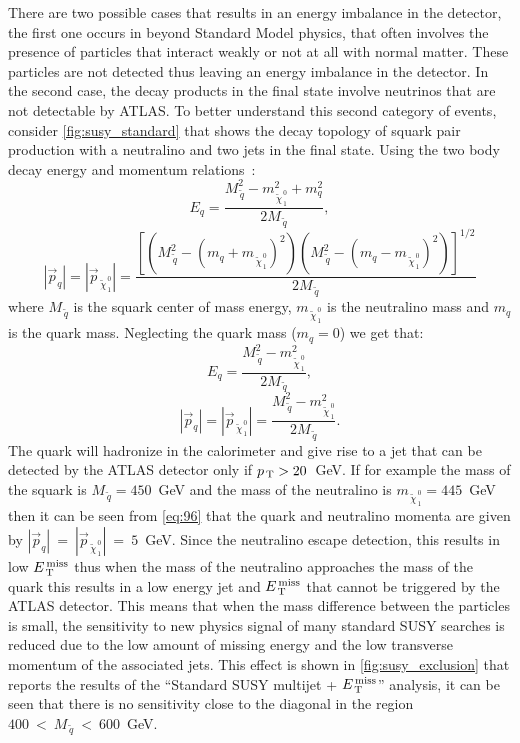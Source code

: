 There are two possible cases that results in an energy imbalance in the
detector, the first one occurs in beyond Standard Model physics, that often
involves the presence of particles that interact weakly or not at all with
normal matter. These particles are not detected thus leaving an energy imbalance
in the detector. In the second case, the decay products in the final state
involve neutrinos that are not detectable by ATLAS\@. To better understand this
second category of events, consider \cref{fig:susy_standard} that shows the
decay topology of squark pair production with a neutralino and two jets in the
final state. Using the two body decay energy and momentum relations~\cite{PDG}:
\begin{equation}
  \label{eq:93}
  E_q = \frac{M_{\, \tilde{q}}^2 - m_{\, \tilde{\chi}_{\, 1}^{\, 0}}^2 + m_q^2}{2
    M_{\, \tilde{q}}},
\end{equation}
\begin{equation}
  \label{eq:94}
  |\vec{p}_q| = |\vec{p}_{\, \tilde{\chi}_{\, 1}^{\, 0}}| = \frac{\left[ \left(
        M_{\, \tilde{q}}^2 - (m_q + m_{\, \tilde{\chi}_{\, 1}^{\, 0}})^2
      \right) \left( M_{\, \tilde{q}}^2 - (m_q - m_{\, \tilde{\chi}_{\, 1}^{\,
            0}})^2 \right) \right]^{1/2}}{2 M_{\, \tilde{q}}}
\end{equation}
where $M_{\, \tilde{q}}$ is the squark center of mass energy,
$m_{\, \tilde{\chi}_{\, 1}^{\, 0}}$ is the neutralino mass and $m_q$ is the
quark mass. Neglecting the quark mass ($m_q = 0$) we get that:
\begin{equation}
  \label{eq:95}
  E_q = \frac{M_{\, \tilde{q}}^2 - m_{\, \tilde{\chi}_{\, 1}^{\, 0}}^2}{2 M_{\,
      \tilde{q}}},
\end{equation}
\begin{equation}
  \label{eq:96}
  |\vec{p}_q| = |\vec{p}_{\, \tilde{\chi}_{\, 1}^{\, 0}}| = \frac{M_{\,
      \tilde{q}}^2 - m_{\, \tilde{\chi}_{\, 1}^{\, 0}}^2}{2 M_{\, \tilde{q}}}.
\end{equation}
The quark will hadronize in the calorimeter and give rise to a jet that can be
detected by the ATLAS detector only if $p_\mathrm{\, T} > 20$~GeV. If for example the mass
of the squark is $M_{\, \tilde{q}} = 450$~GeV and the mass of the neutralino is
$m_{\, \tilde{\chi}_{\, 1}^{\, 0}} = 445$~GeV then it can be seen from
\cref{eq:96} that the quark and neutralino momenta are given by
$|\vec{p}_q|~=~|\vec{p}_{\, \tilde{\chi}_{\, 1}^{\, 0}}|~=~5$~GeV. Since the
neutralino escape detection, this results in low $E_\mathrm{\, T}^\mathrm{\, miss}$ thus when the mass of
the neutralino approaches the mass of the quark this results in a low energy jet
and $E_\mathrm{\, T}^\mathrm{\, miss}$ that cannot be triggered by the ATLAS detector. This means that when
the mass difference between the particles is small, the sensitivity to new
physics signal of many standard SUSY searches is reduced due to the low amount
of missing energy and the low transverse momentum of the associated jets. This
effect is shown in \cref{fig:susy_exclusion} that reports the results of the
``Standard SUSY multijet + $E_\mathrm{\, T}^\mathrm{\, miss}$'' analysis, it can be seen that there is no
sensitivity close to the diagonal in the region
$400~<~M_{\, \tilde{q}}~<~600$~GeV.

